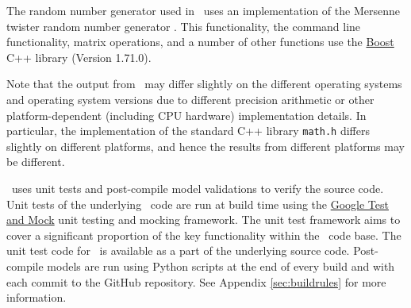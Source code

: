 The random number generator used in \CNAME\ uses an implementation of the Mersenne twister random number generator \citep{796}. This functionality, the command line functionality, matrix operations, and a number of other functions use the \href{http://www.boost.org/}{Boost} C++ library (Version 1.71.0).

Note that the output from \CNAME\ may differ slightly on the different operating systems and operating system versions due to different precision arithmetic or other platform-dependent (including CPU hardware) implementation details. In particular, the implementation of the standard C++ library \texttt{math.h} differs slightly on different platforms, and hence the results from different platforms may be different.

\CNAME\ uses unit tests and post-compile model validations to verify the source code. Unit tests of the underlying \CNAME\ code are run at build time using the \href{https://github.com/google/googletest}{Google Test and Mock} unit testing and mocking framework. The unit test framework aims to cover a significant proportion of the key functionality within the \CNAME\ code base. The unit test code for \CNAME\ is available as a part of the underlying source code. Post-compile models are run using Python scripts at the end of every build and with each commit to the GitHub repository. See Appendix \ref{sec:buildrules} for more information. 


